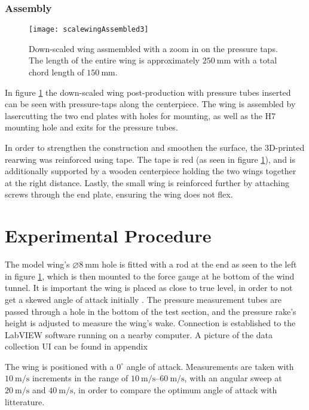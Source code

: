       \subsubsection{Assembly}

      \begin{figure}
        \texttt{[image: scalewingAssembled3]}
        \caption{Down-scaled wing assmembled with a zoom in on the pressure taps. The length of the entire wing is approximately $\SI{250}{\milli\metre}$ with a total chord length of $\SI{150}{\milli\metre}$.}
        \label{fig:scalewing}
      \end{figure}

      In figure \ref{fig:scalewing} the down-scaled wing post-production with pressure tubes inserted can be seen with pressure-taps along the centerpiece. The wing is assembled by lasercutting the two end plates with holes for mounting, as well as the H7 mounting hole and exits for the pressure tubes.

      In order to strengthen the construction and smoothen the surface, the 3D-printed rearwing was reinforced using tape. The tape is red (as seen in figure \ref{fig:scalewing}), and is additionally supported by a wooden centerpiece holding the two wings together at the right distance. Lastly, the small wing is reinforced further by attaching screws through the end plate, ensuring the wing does not flex.

\section{Experimental Procedure}

  The model wing's $\diameter\SI{8}{\milli\metre}$ hole is fitted with a rod at the end as seen to the left in figure \ref{fig:scalewing}, which is then mounted to the force gauge at he bottom of the wind tunnel. It is important the wing is placed as close to true level, in order to not get a skewed angle of attack initially \cite{truelevel}. The pressure measurement tubes are passed through a hole in the bottom of the test section, and the pressure rake's height is adjusted to measure the wing's wake. Connection is established to the LabVIEW software running on a nearby computer. A picture of the data collection UI can be found in appendix %

  The wing is positioned with a $0^\circ$ angle of attack. Measurements are taken with $\SI{10}{\metre\per\second}$ increments in the range of $\SIrange{10}{60}{\metre\per\second}$, with an angular sweep at $\SI{20}{\metre\per\second}$ and $\SI{40}{\metre\per\second}$, in order to compare the optimum angle of attack with litterature.

